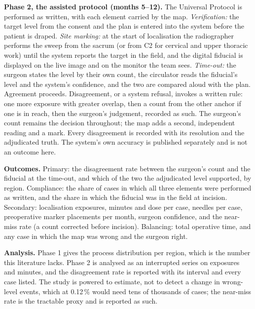 \documentclass[11pt,letterpaper]{article}
\begin{document}
\noindent\textbf{Phase 2, the assisted protocol (months 5--12).} The Universal Protocol is performed as
written, with each element carried by the map. \emph{Verification:} the target level from the consent
and the plan is entered into the system before the patient is draped. \emph{Site marking:} at the start of
localisation the radiographer performs the sweep from the sacrum (or from C2 for cervical and upper
thoracic work) until the system reports the target in the field, and the digital fiducial is displayed on
the live image and on the monitor the team sees. \emph{Time-out:} the surgeon states the level by their
own count, the circulator reads the fiducial's level and the system's confidence, and the two are
compared aloud with the plan. Agreement proceeds. Disagreement, or a system refusal, invokes a written
rule: one more exposure with greater overlap, then a count from the other anchor if one is in reach, then
the surgeon's judgement, recorded as such. The surgeon's count remains the decision throughout; the map
adds a second, independent reading and a mark. Every disagreement is recorded with its resolution and the
adjudicated truth. The system's own accuracy is published separately and is not an outcome here.

\noindent\textbf{Outcomes.} Primary: the disagreement rate between the surgeon's count and the fiducial
at the time-out, and which of the two the adjudicated level supported, by region. Compliance: the share
of cases in which all three elements were performed as written, and the share in which the fiducial was
in the field at incision. Secondary: localisation exposures,
minutes and dose per case, needles per case, preoperative marker placements per month, surgeon
confidence, and the near-miss rate (a count corrected before incision). Balancing: total operative
time, and any case in which the map was wrong and the surgeon right.

\noindent\textbf{Analysis.} Phase 1 gives the process distribution per region, which is the number this
literature lacks. Phase 2 is analysed as an interrupted series on exposures and minutes, and the
disagreement rate is reported with its interval and every case listed. The study is powered to
estimate, not to detect a change in wrong-level events, which at 0.12\,\% would need tens of thousands
of cases; the near-miss rate is the tractable proxy and is reported as such.
\end{document}
